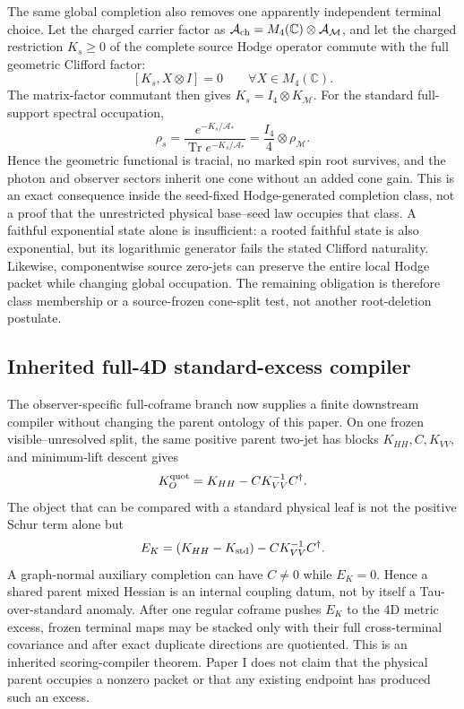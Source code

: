 \documentclass[11pt]{article}
\begin{document}
The same global completion also removes one apparently independent terminal
choice.  Let the charged carrier factor as
\(\mathcal A_{\rm ch}=M_4(\mathbb C)\otimes\mathcal A_{\mathcal M}\), and let
the charged restriction \(K_s\geq0\) of the complete source Hodge operator
commute with the full geometric Clifford factor:
\[
 [K_s,X\otimes I]=0\qquad\forall X\in M_4(\mathbb C).
\]
The matrix-factor commutant then gives \(K_s=I_4\otimes K_{\mathcal M}\).
For the standard full-support spectral occupation,
\[
 \rho_s=\frac{e^{-K_s/\mathcal A_*}}
 {\operatorname{Tr}e^{-K_s/\mathcal A_*}}
 =\frac{I_4}{4}\otimes\rho_{\mathcal M}.
\]
Hence the geometric functional is tracial, no marked spin root survives, and
the photon and observer sectors inherit one cone without an added cone gain.
This is an exact consequence inside the seed-fixed Hodge-generated completion
class, not a proof that the unrestricted physical base--seed law occupies that
class.  A faithful exponential state alone is insufficient: a rooted faithful
state is also exponential, but its logarithmic generator fails the stated
Clifford naturality.  Likewise, componentwise source zero-jets can preserve the
entire local Hodge packet while changing global occupation.  The remaining
obligation is therefore class membership or a source-frozen cone-split test,
not another root-deletion postulate.

\subsection{Inherited full-4D standard-excess compiler}

The observer-specific full-coframe branch now supplies a finite downstream
compiler without changing the parent ontology of this paper.  On one frozen
visible--unresolved split, the same positive parent two-jet has blocks
\(K_{HH},C,K_{VV}\), and minimum-lift descent gives
\[
 K_O^{\rm quot}=K_{HH}-CK_{VV}^{-1}C^\dagger.
\]
The object that can be compared with a standard physical leaf is not the
positive Schur term alone but
\begin{equation}
 E_K=(K_{HH}-K_{\rm std})-CK_{VV}^{-1}C^\dagger .
 \label{eq:paperi-g4d-standard-excess}
\end{equation}
A graph-normal auxiliary completion can have \(C\neq0\) while
\(E_K=0\).  Hence a shared parent mixed Hessian is an internal coupling datum,
not by itself a Tau-over-standard anomaly.  After one regular coframe pushes
\(E_K\) to the 4D metric excess, frozen terminal maps may be stacked only with
their full cross-terminal covariance and after exact duplicate directions are
quotiented.  This is an inherited scoring-compiler theorem.  Paper I does not
claim that the physical parent occupies a nonzero packet or that any existing
endpoint has produced such an excess.
\end{document}
